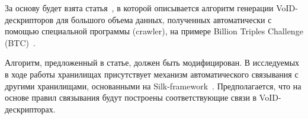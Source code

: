 \documentclass[a4paper, final, 14 pt]{extarticle}
\begin{document}
За основу будет взята статья~\cite{article:voidauto}, в которой описывается алгоритм генерации 
VoID-дескрипторов для большого объема данных, полученных автоматически с помощью специальной 
программы (crawler), на примере Billion Triples Challenge (BTC)~\cite{web:btc}.

Алгоритм, предложенный в статье, должен быть модифицирован. В исследуемых в ходе работы хранилищах
присутствует механизм автоматического связывания с другими хранилищами, основанными на 
Silk-framework~\cite{web:silk}. Предполагается, что на основе правил связывания будут построены 
соответствующие связи в VoID-дескрипторах.

\newpage










\end{document}
